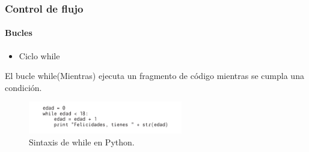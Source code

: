 \begin{frame}[fragile]
  \frametitle{Control de flujo}

    \framesubtitle{Bucles}    
  
  \begin{itemize}
    \item Ciclo while
  \end{itemize}

  El bucle while(Mientras) ejecuta un fragmento de c\'odigo mientras se cumpla una condici\'on.

  \begin{figure}
    \includegraphics[width=0.6\textwidth]{Imagenes/While.jpg}
    \caption{\label{fig:Ejemplo7}Sintaxis de while en Python.}
  \end{figure}

\end{frame}

